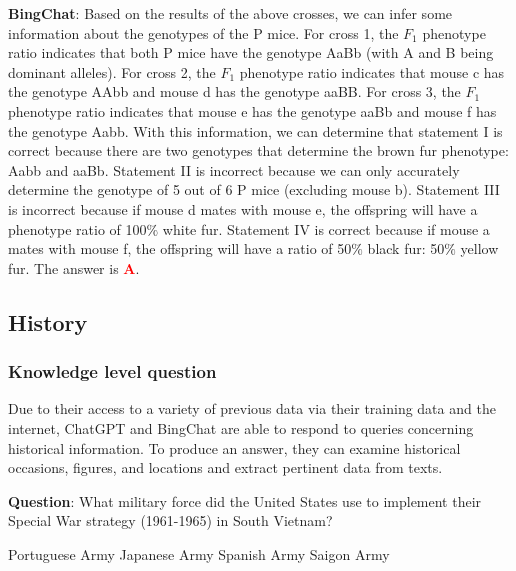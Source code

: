 \documentclass{article}
\begin{document}
{\begin{mdframed}[linewidth=1pt,linecolor=red]
		\textbf{BingChat}: Based on the results of the above crosses, we can infer some information about the genotypes of the P mice. For cross 1, the $F_1$ phenotype ratio indicates that both P mice have the genotype AaBb (with A and B being dominant alleles). For cross 2, the $F_1$ phenotype ratio indicates that mouse c has the genotype AAbb and mouse d has the genotype aaBB. For cross 3, the $F_1$ phenotype ratio indicates that mouse e has the genotype aaBb and mouse f has the genotype Aabb. With this information, we can determine that statement I is correct because there are two genotypes that determine the brown fur phenotype: Aabb and aaBb. Statement II is incorrect because we can only accurately determine the genotype of 5 out of 6 P mice (excluding mouse b). Statement III is incorrect because if mouse d mates with mouse e, the offspring will have a phenotype ratio of 100$\%$ white fur. Statement IV is correct because if mouse a mates with mouse f, the offspring will have a ratio of 50$\%$ black fur: 50$\%$ yellow fur. The answer is \textcolor{red}{\textbf{A}}. 
		
	\end{mdframed}
	
	\subsection{History}
	\label{VNHSGE_His}
	
	\subsubsection{Knowledge level question}
	\label{VNHSGE_His_K}
	
	Due to their access to a variety of previous data via their training data and the internet, ChatGPT and BingChat are able to respond to queries concerning historical information. To produce an answer, they can examine historical occasions, figures, and locations and extract pertinent data from texts.
	
	
	
	\begin{mdframed}[linewidth=1pt,linecolor=red] \textbf{Question}: What military force did the United States use to implement their Special War strategy (1961-1965) in South Vietnam? 
		
		\begin{oneparchoices}
			\choice Portuguese Army 
			\choice Japanese Army
			\choice Spanish Army
			\choice Saigon Army
		\end{oneparchoices}
		

\end{mdframed}}
\end{document}
